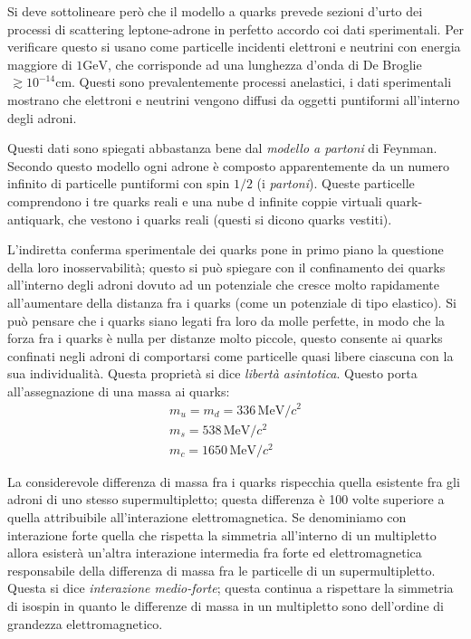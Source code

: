 Si deve sottolineare però che il modello a quarks prevede sezioni d'urto dei 
processi di scattering leptone-adrone
in perfetto accordo coi dati sperimentali.
Per verificare questo si usano come particelle incidenti elettroni e neutrini 
con energia maggiore
di $1\si{\giga\electronvolt}$, che corrisponde ad una lunghezza d'onda di De 
Broglie \textcrlambda$\,\gtrsim
10^{-14}\si{\centi\meter}$.
Questi sono prevalentemente processi anelastici, i dati sperimentali mostrano 
che elettroni e neutrini
vengono diffusi da oggetti puntiformi all'interno degli adroni.

Questi dati sono spiegati abbastanza bene dal \textit{modello a partoni} di 
Feynman. Secondo questo modello
ogni adrone è composto apparentemente da un numero infinito di particelle 
puntiformi con spin $1/2$ (i
\textit{partoni}).
Queste particelle comprendono i tre quarks reali e una nube d infinite coppie 
virtuali quark-antiquark, che vestono
i quarks reali (questi si dicono quarks vestiti).

L'indiretta conferma sperimentale dei quarks pone in primo piano la questione 
della loro inosservabilità; questo si
può spiegare con il confinamento dei quarks all'interno degli adroni dovuto ad 
un potenziale che cresce molto
rapidamente all'aumentare della distanza fra i quarks (come un potenziale di 
tipo elastico).
Si può pensare che i quarks siano legati fra loro da molle perfette, in modo 
che la forza fra i quarks è nulla
per distanze molto piccole, questo consente ai quarks confinati negli adroni di 
comportarsi come particelle quasi
libere ciascuna con la sua individualità.
Questa proprietà si dice \textit{libertà asintotica}. Questo porta 
all'assegnazione di una massa ai quarks:
\begin{gather}
m_u=m_d=336\,\si{\mega\electronvolt}/c^2\\
m_s=538\,\si{\mega\electronvolt}/c^2\\
m_c=1650\,\si{\mega\electronvolt}/c^2
\end{gather}

La considerevole differenza di massa fra i quarks rispecchia quella esistente 
fra gli adroni di uno stesso supermultipletto;
questa differenza è 100 volte superiore a quella attribuibile all'interazione 
elettromagnetica.
Se denominiamo con interazione forte quella che rispetta la simmetria 
all'interno di un multipletto allora
esisterà un'altra interazione intermedia fra forte ed elettromagnetica 
responsabile della differenza di massa fra
le particelle di un supermultipletto.
Questa si dice \textit{interazione medio-forte}; questa continua a rispettare 
la simmetria di isospin in quanto le
differenze di massa in un multipletto sono dell'ordine di grandezza 
elettromagnetico.

